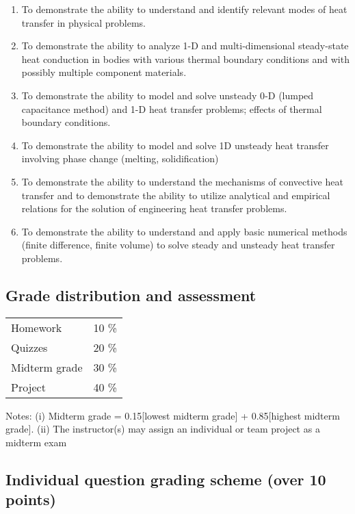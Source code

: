 \documentclass{article}%
\begin{document}
%
\begin{enumerate}[label=\alph*)]%
\item%
To demonstrate the ability to understand and identify relevant modes of heat transfer in physical problems.%
\item%
To demonstrate the ability to analyze 1{-}D and multi{-}dimensional steady{-}state heat conduction in bodies with various thermal boundary conditions and with possibly multiple component materials.%
\item%
To demonstrate the ability to model and solve unsteady 0{-}D (lumped capacitance method) and 1{-}D heat transfer problems; effects of thermal boundary conditions.%
\item%
To demonstrate the ability to model and solve 1D unsteady heat transfer involving phase change (melting, solidification)%
\item%
To demonstrate the ability to understand the mechanisms of convective heat transfer and to demonstrate the ability to utilize analytical and empirical relations for the solution of engineering heat transfer problems.%
\item%
To demonstrate the ability to understand and apply basic numerical methods (finite difference, finite volume) to solve steady and unsteady heat transfer problems.%
\end{enumerate}%
\subsection*{Grade distribution and assessment}%
\label{subsec:Grade distribution and assessment}%

%
\begin{tabular}{|l|c|}%
\hline%
Homework&10 \%\\%
Quizzes&20 \%\\%
Midterm grade&30 \%\\%
Project&40 \%\\%
\hline%
\end{tabular}%
\linebreak%
Notes: (i) Midterm grade = 0.15{[}lowest midterm grade{]} + 0.85{[}highest midterm grade{]}. (ii) The instructor(s) may assign an individual or team project as a midterm exam%
\subsection*{Individual question grading scheme (over 10 points)}%
\label{subsec:Individual question grading scheme (over 10 points)}%
\end{document}
